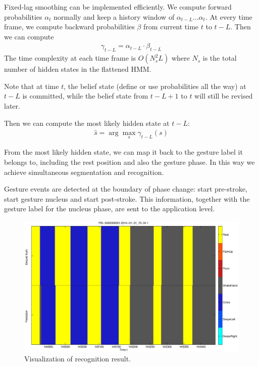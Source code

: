 \documentclass[conference]{IEEEtran}
\begin{document}
Fixed-lag smoothing can be implemented efficiently. We compute forward
probabilities $\alpha_t$ normally and keep a history window of $\alpha_{t -
L}\ldots\alpha_t$. At every time frame, we compute backward probabilities
$\beta$ from current time $t$ to $t - L$. Then we can compute
\begin{align}
\gamma_{t - L} = \alpha_{t - L} \cdot \beta_{t - L}
\end{align}  
The time complexity at each time frame is $O(N_s^2L)$ where $N_s$ is the total
number of hidden states in the flattened HMM.

Note that at time $t$, the belief state (define or use probabilities all the
way) at $t - L$ is committed, while the belief state from $t - L + 1$ to $t$ will still be revised later.

Then we can compute the most likely hidden state at $t - L$:
\begin{align}
\hat{s} = \arg\max_s \gamma_{t - L}(s)
\end{align}

From the most likely hidden state, we can map it back to the gesture label it
belongs to, including the rest position and also the gesture phase. In this way
we achieve simultaneous segmentation and recognition.

Gesture events are detected at the boundary of phase change: start pre-stroke,
start gesture nucleus and start post-stroke. This information, together with the
gesture label for the nucleus phase, are sent to the application level.

\begin{figure}[t]
\centering
\includegraphics[width=\columnwidth]{fig/circle_shake.eps}
\caption{Visualization of recognition result.}
\label{fig:visual_recog}
\end{figure}
\end{document}
